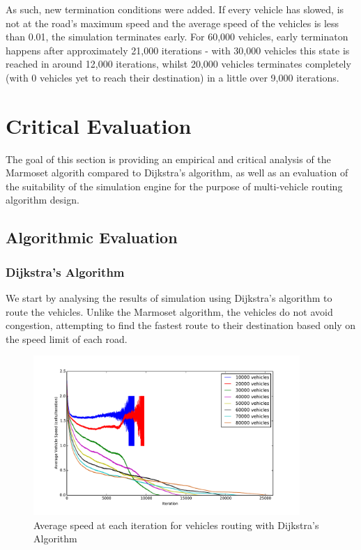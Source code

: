 \documentclass[ %
                    author={Alexander Hill},
                supervisor={Dr. Benjamin Sach},
                    degree={MEng},
                     title={MARMOSET},
                  subtitle={Multi-Agent Route Management using Online Simulation for Efficient Transportation},
                      type={research},
                      year={2016} ]{dissertation}
\begin{document}
As such, new termination conditions were added. If every vehicle has slowed,
is not at the road's maximum speed and the average speed of the vehicles is less
than 0.01, the simulation terminates early. For 60,000 vehicles, early terminaton
happens after approximately 21,000 iterations - with 30,000 vehicles this state
is reached in around 12,000 iterations, whilst 20,000 vehicles terminates
completely (with 0 vehicles yet to reach their destination) in a little over
9,000 iterations.


\chapter{Critical Evaluation}
\label{chap:evaluation}

The goal of this section is providing an empirical and critical analysis of the
Marmoset algorith compared to Dijkstra's algorithm, as well as an evaluation of
the suitability of the simulation engine for the purpose of multi-vehicle
routing algorithm design.

\section{Algorithmic Evaluation}

\subsection{Dijkstra's Algorithm}\label{sec:density}

We start by analysing the results of simulation using Dijkstra's algorithm to
route the vehicles. Unlike the Marmoset algorithm, the vehicles do not avoid
congestion, attempting to find the fastest route to their destination based only
on the speed limit of each road.

\begin{figure}[h]
    \centering
    \includegraphics[width=0.9\textwidth]{dijkstra-speed}
    \caption{Average speed at each iteration for vehicles routing with
    Dijkstra's Algorithm}\label{fig:dijkstra-speed}
\end{figure}
\end{document}

